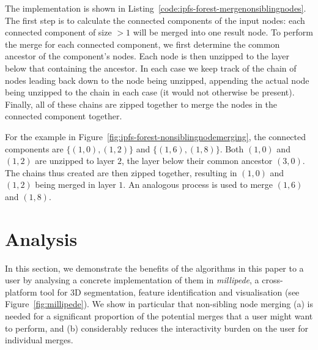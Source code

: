 \documentclass[10pt,twocolumn,twoside]{IEEEtran}
\begin{document}
The implementation is shown in Listing~\ref{code:ipfs-forest-mergenonsiblingnodes}. The first step is to calculate the connected components of the input nodes: each connected component of size $> 1$ will be merged into one result node. To perform the merge for each connected component, we first determine the common ancestor of the component's nodes. Each node is then unzipped to the layer below that containing the ancestor. In each case we keep track of the chain of nodes leading back down to the node being unzipped, appending the actual node being unzipped to the chain in each case (it would not otherwise be present). Finally, all of these chains are zipped together to merge the nodes in the connected component together.

For the example in Figure~\ref{fig:ipfs-forest-nonsiblingnodemerging}, the connected components are $\{(1,0),(1,2)\}$ and $\{(1,6),(1,8)\}$. Both $(1,0)$ and $(1,2)$ are unzipped to layer $2$, the layer below their common ancestor $(3,0)$. The chains thus created are then zipped together, resulting in $(1,0)$ and $(1,2)$ being merged in layer $1$. An analogous process is used to merge $(1,6)$ and $(1,8)$.

\section{Analysis}
\label{sec:analysis}

In this section, we demonstrate the benefits of the algorithms in this paper to a user by analysing a concrete implementation of them in \emph{millipede}, a cross-platform tool for 3D segmentation, feature identification and visualisation (see Figure~\ref{fig:millipede}). We show in particular that non-sibling node merging (a) is needed for a significant proportion of the potential merges that a user might want to perform, and (b) considerably reduces the interactivity burden on the user for individual merges.
\end{document}
